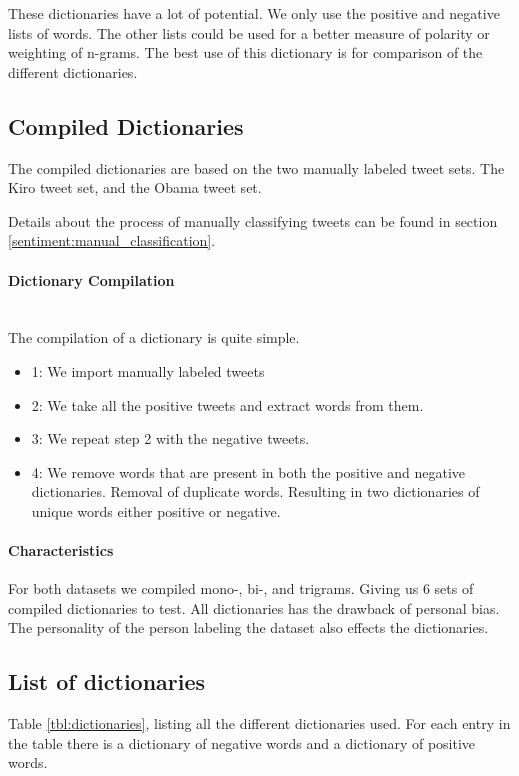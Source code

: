 These dictionaries have a lot of potential. We only use the
positive and negative lists of words. The other lists could be used for a
better measure of polarity or weighting of n-grams. The best use of this
dictionary is for comparison of the different dictionaries.  
%

\subsection{Compiled Dictionaries}\label{data:compiled_dictionaries}
The compiled dictionaries are based on the two manually labeled tweet sets. The
Kiro tweet set, and the Obama tweet set.

Details about the process of manually classifying tweets can be found in section
\ref{sentiment:manual_classification}.

\paragraph{Dictionary Compilation}
\hspace{0pt}\\
The compilation of a dictionary is quite simple. 
\begin{itemize}
    \item 1: We import manually labeled tweets
    \item 2: We take all the positive tweets and extract words from them. 
    \item 3: We repeat step 2 with the negative tweets. 
    \item 4: We remove words that are present in both the positive and negative
dictionaries. Removal of duplicate words. Resulting in two dictionaries of
unique words either positive or negative.  
\end{itemize}

\paragraph{Characteristics}
For both datasets we compiled mono-, bi-, and trigrams. Giving us 6 sets of
compiled dictionaries to test. All dictionaries has the drawback of personal
bias. The personality of the person labeling the dataset also effects the
dictionaries. 
%

\subsection{List of dictionaries}
Table \ref{tbl:dictionaries}, listing all the different dictionaries used. 
For each entry in the table there is a dictionary of negative words and a
dictionary of positive words. 

